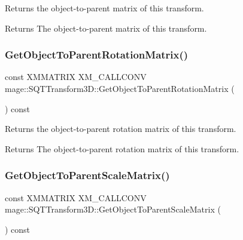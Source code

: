 Returns the object-\/to-\/parent matrix of this transform.

\begin{DoxyReturn}{Returns}
The object-\/to-\/parent matrix of this transform. 
\end{DoxyReturn}
\mbox{\label{classmage_1_1_s_q_t_transform3_d_a68021401316fcfa6a2c80913edd13253}} 
\subsubsection{\texorpdfstring{Get\+Object\+To\+Parent\+Rotation\+Matrix()}{GetObjectToParentRotationMatrix()}}
{\footnotesize\ttfamily const X\+M\+M\+A\+T\+R\+IX X\+M\+\_\+\+C\+A\+L\+L\+C\+O\+NV mage\+::\+S\+Q\+T\+Transform3\+D\+::\+Get\+Object\+To\+Parent\+Rotation\+Matrix (\begin{DoxyParamCaption}{ }\end{DoxyParamCaption}) const\hspace{0.3cm}{\ttfamily [noexcept]}}

Returns the object-\/to-\/parent rotation matrix of this transform.

\begin{DoxyReturn}{Returns}
The object-\/to-\/parent rotation matrix of this transform. 
\end{DoxyReturn}
\mbox{\label{classmage_1_1_s_q_t_transform3_d_a64ad3a88479badb2d94638705f75515f}} 
\subsubsection{\texorpdfstring{Get\+Object\+To\+Parent\+Scale\+Matrix()}{GetObjectToParentScaleMatrix()}}
{\footnotesize\ttfamily const X\+M\+M\+A\+T\+R\+IX X\+M\+\_\+\+C\+A\+L\+L\+C\+O\+NV mage\+::\+S\+Q\+T\+Transform3\+D\+::\+Get\+Object\+To\+Parent\+Scale\+Matrix (\begin{DoxyParamCaption}{ }\end{DoxyParamCaption}) const\hspace{0.3cm}{\ttfamily [noexcept]}}

